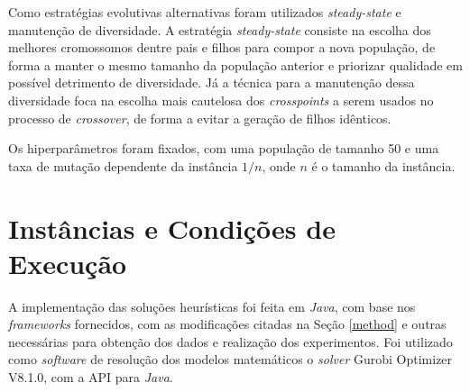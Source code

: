 \documentclass{MO824}
\begin{document}
	
Como estratégias evolutivas alternativas foram utilizados \textit{steady-state} e manutenção de diversidade. A estratégia \textit{steady-state} consiste na escolha dos melhores cromossomos dentre pais e filhos para compor a nova população, de forma a manter o mesmo tamanho da população anterior e priorizar qualidade em possível detrimento de diversidade. Já a técnica para a manutenção dessa diversidade foca na escolha mais cautelosa dos \textit{crosspoints} a serem usados no processo de \textit{crossover}, de forma a evitar a geração de filhos idênticos.

Os hiperparâmetros foram fixados, com uma população de tamanho 50 e uma taxa de mutação dependente da instância $1/n$, onde $n$ é o tamanho da instância.


\section{Instâncias e Condições de Execução}
    A implementação das soluções heurísticas foi feita em \emph{Java}, com base nos \textit{frameworks} fornecidos, com as modificações citadas na Seção \ref{method} e outras necessárias para obtenção dos dados e realização dos experimentos. Foi utilizado como \textit{software} de resolução dos modelos matemáticos o \textit{solver} Gurobi Optimizer V8.1.0, com a API para \textit{Java}.
\end{document}
